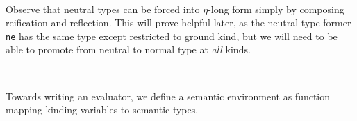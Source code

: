 \documentclass[authoryear, acmsmall, screen, review, nonacm]{acmart}
\begin{document}
\begin{code}%
\>[0]\AgdaSpace{}%
\AgdaSymbol{\{}\AgdaSpace{}%
\AgdaSymbol{=}\AgdaSpace{}%
\AgdaSpace{}%
\AgdaSpace{}%
\AgdaSymbol{\}}\AgdaSpace{}%
\AgdaSpace{}%
\AgdaSymbol{=}\AgdaSpace{}%
\AgdaSpace{}%
\<%
\\
\>[0]\AgdaSpace{}%
\AgdaSymbol{\{}\AgdaSpace{}%
\AgdaSymbol{=}\AgdaSpace{}%
\AgdaSymbol{\}}\AgdaSpace{}%
\AgdaSpace{}%
\AgdaSymbol{=}\AgdaSpace{}%
\AgdaSpace{}%
\AgdaSymbol{(}\AgdaSpace{}%
\AgdaSymbol{(}\AgdaSpace{}%
\AgdaSpace{}%
\AgdaSymbol{(}\AgdaSpace{}%
\AgdaSymbol{\{}\AgdaSpace{}%
\AgdaSymbol{=}\AgdaSpace{}%
\AgdaSymbol{\}}\AgdaSpace{}%
\AgdaSymbol{(}\AgdaSpace{}%
\AgdaSymbol{))))}\<%
\end{code}

Observe that neutral types can be forced into $\eta$-long form simply by composing reification and reflection. This will prove helpful later, as the neutral type former \verb!ne! has the same type except restricted to ground kind, but we will need to be able to promote from neutral to normal type at \emph{all} kinds.

\begin{code}%
\>[0]\AgdaSpace{}%
\AgdaSymbol{:}\AgdaSpace{}%
\AgdaSpace{}%
\AgdaSpace{}%
\AgdaSpace{}%
\AgdaSpace{}%
\AgdaSpace{}%
\AgdaSpace{}%
\<%
\\
\>[0]\AgdaSpace{}%
\AgdaSymbol{=}\AgdaSpace{}%
\AgdaSpace{}%
\AgdaSpace{}%
\<%
\end{code}

Towards writing an evaluator, we define a semantic environment as function mapping kinding variables to semantic types.

\begin{code}%
\>[0]\AgdaSpace{}%
\AgdaSymbol{:}\AgdaSpace{}%
\AgdaSpace{}%
\AgdaSpace{}%
\AgdaSpace{}%
\AgdaSpace{}%
\<%
\\
\>[0]\AgdaSpace{}%
\AgdaSpace{}%
\AgdaSpace{}%
\AgdaSymbol{=}\AgdaSpace{}%
\AgdaSpace{}%
\AgdaSymbol{\{}\AgdaSymbol{\}}\AgdaSpace{}%
\AgdaSpace{}%
\AgdaSpace{}%
\AgdaSpace{}%
\AgdaSpace{}%
\AgdaSpace{}%
\AgdaSpace{}%
\AgdaSpace{}%
\<%
\end{code}
\end{document}
